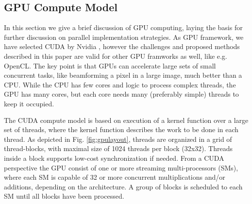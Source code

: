 \documentclass[journal]{IEEEtran}
\begin{document}



\subsection{GPU Compute Model}



In this section we give a brief discussion of GPU computing, laying the basis for further discussion on parallel implementation strategies. As GPU framework, we have selected CUDA by Nvidia \cite{Nvidia2011}, however the challenges and proposed methods described in this paper are valid for other GPU framworks as well, like e.g. OpenCL. The key point is that GPUs can accelerate large sets of small concurrent tasks, like beamforming a pixel in a large image, much better than a CPU. While the CPU has few cores and logic to process complex threads, the GPU has many cores, but each core needs many (preferably simple) threads to keep it occupied.

The CUDA compute model is based on execution of a kernel function over a large set of threads, where the kernel function describes the work to be done in each thread. As depicted in Fig. \ref{fig:gpulayout}, threads are organized in a grid of thread-blocks, with maximal size of 1024 threads per block (32x32). Threads inside a block supports low-cost synchronization if needed. From a CUDA perspective the GPU consist of one or more streaming multi-processors (SMs), where each SM is capable of 32 or more concurrent multiplications and/or additions, depending on the architecture. A group of blocks is scheduled to each SM until all blocks have been processed.
\end{document}
